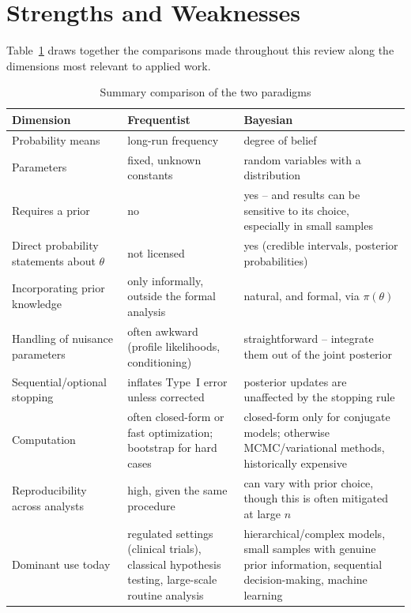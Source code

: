 \documentclass[11pt,a4paper]{article}
\begin{document}
\section{Strengths and Weaknesses}
Table~\ref{tab:summary} draws together the comparisons made throughout this review along the dimensions most relevant to applied work.

\begin{table}[h]
\centering
\caption{Summary comparison of the two paradigms}
\label{tab:summary}
\begin{tabular}{@{}p{3.1cm}p{5.6cm}p{5.6cm}@{}}
\toprule
\textbf{Dimension} & \textbf{Frequentist} & \textbf{Bayesian} \\
\midrule
Probability means & long-run frequency & degree of belief \\
Parameters & fixed, unknown constants & random variables with a distribution \\
Requires a prior & no & yes -- and results can be sensitive to its choice, especially in small samples \\
Direct probability statements about $\theta$ & not licensed & yes (credible intervals, posterior probabilities) \\
Incorporating prior knowledge & only informally, outside the formal analysis & natural, and formal, via $\pi(\theta)$ \\
Handling of nuisance parameters & often awkward (profile likelihoods, conditioning) & straightforward -- integrate them out of the joint posterior \\
Sequential/optional stopping & inflates Type~I error unless corrected & posterior updates are unaffected by the stopping rule \\
Computation & often closed-form or fast optimization; bootstrap for hard cases & closed-form only for conjugate models; otherwise MCMC/variational methods, historically expensive \\
Reproducibility across analysts & high, given the same procedure & can vary with prior choice, though this is often mitigated at large $n$ \\
Dominant use today & regulated settings (clinical trials), classical hypothesis testing, large-scale routine analysis & hierarchical/complex models, small samples with genuine prior information, sequential decision-making, machine learning \\
\bottomrule
\end{tabular}
\end{table}
\end{document}
